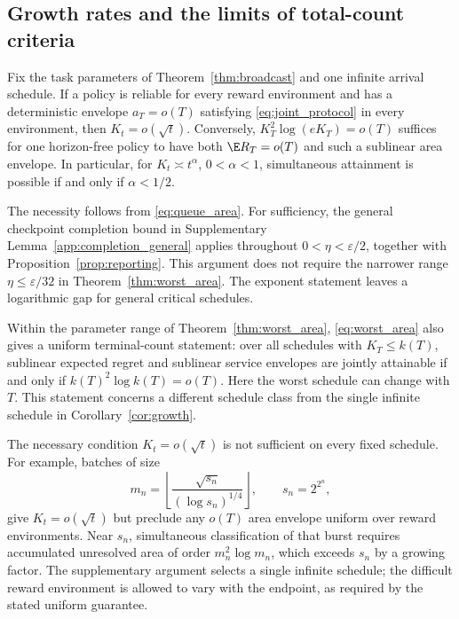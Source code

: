 \subsection{Growth rates and the limits of total-count criteria}

\begin{corollary}
\label{cor:growth}
Fix the task parameters of Theorem~\ref{thm:broadcast} and one infinite arrival
schedule. If a policy is reliable for every reward environment and has a
deterministic envelope $a_T=o(T)$ satisfying \eqref{eq:joint_protocol} in
every environment, then $K_t=o(\sqrt t)$. Conversely,
$K_T^2\log(eK_T)=o(T)$ suffices for one horizon-free policy to have both
$\E R_T=o(T)$ and such a sublinear area envelope. In particular, for
$K_t\asymp t^\alpha$, $0<\alpha<1$, simultaneous attainment is possible if
and only if $\alpha<1/2$.
\end{corollary}

The necessity follows from \eqref{eq:queue_area}. For sufficiency, the general
checkpoint completion bound in Supplementary Lemma~\ref{app:completion_general}
applies throughout $0<\eta<\varepsilon/2$, together with
Proposition~\ref{prop:reporting}. This argument does not require the narrower
range $\eta\le\varepsilon/32$ in Theorem~\ref{thm:worst_area}. The exponent
statement leaves a logarithmic gap for general critical schedules.

Within the parameter range of Theorem~\ref{thm:worst_area},
\eqref{eq:worst_area} also gives a uniform terminal-count statement: over all
schedules with $K_T\le k(T)$, sublinear expected regret and sublinear service
envelopes are jointly attainable if and only if
$k(T)^2\log k(T)=o(T)$. Here the worst schedule can change with $T$.
This statement concerns a different schedule class from the single infinite
schedule in Corollary~\ref{cor:growth}.

The necessary condition $K_t=o(\sqrt t)$ is not sufficient on every fixed
schedule. For example, batches of size
\[
 m_n=\left\lfloor\frac{\sqrt{s_n}}{(\log s_n)^{1/4}}\right\rfloor,
 \qquad s_n=2^{2^n},
\]
give $K_t=o(\sqrt t)$ but preclude any $o(T)$ area envelope uniform over
reward environments. Near $s_n$, simultaneous classification of that burst
requires accumulated unresolved area of order $m_n^2\log m_n$, which exceeds
$s_n$ by a growing factor. The supplementary argument selects a single
infinite schedule; the difficult reward environment is allowed to vary with
the endpoint, as required by the stated uniform guarantee.

